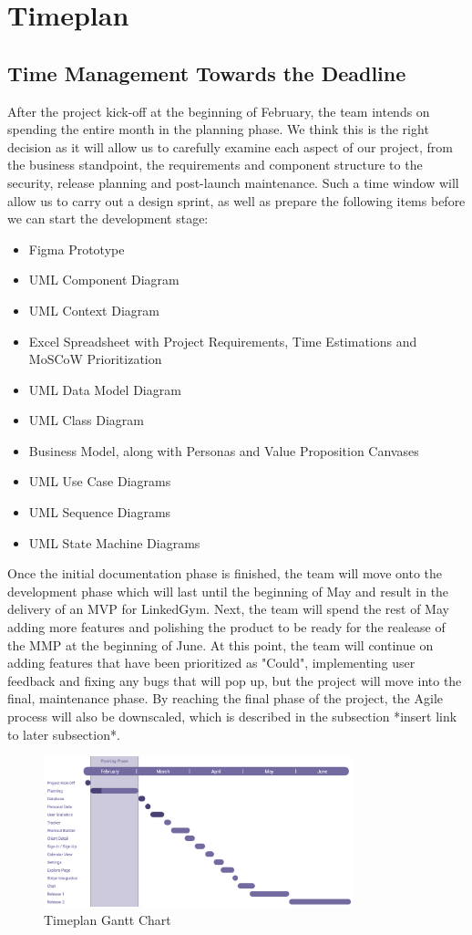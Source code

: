 \section{Timeplan}

\subsection{Time Management Towards the Deadline}

After the project kick-off at the beginning of February, the team intends on spending the entire month in the planning phase. We think
this is the right decision as it will allow us to carefully examine each aspect of our project, from the business standpoint, the requirements
and component structure to the security, release planning and post-launch maintenance. Such a time window will allow us to carry out a design sprint,
as well as prepare the following items before we can start the development stage:
\begin{itemize}
    \item Figma Prototype
    \item UML Component Diagram
    \item UML Context Diagram
    \item Excel Spreadsheet with Project Requirements, Time Estimations and MoSCoW Prioritization
    \item UML Data Model Diagram
    \item UML Class Diagram
    \item Business Model, along with Personas and Value Proposition Canvases
    \item UML Use Case Diagrams
    \item UML Sequence Diagrams
    \item UML State Machine Diagrams
\end{itemize}

Once the initial documentation phase is finished, the team will move onto the development phase which will last until the beginning
of May and result in the delivery of an MVP for LinkedGym. Next, the team will spend the rest of May adding more features and polishing
the product to be ready for the realease of the MMP at the beginning of June. At this point, the team will continue on adding features 
that have been prioritized as "Could", implementing user feedback and fixing any bugs that will pop up, but the project will move into the final, maintenance phase.
By reaching the final phase of the project, the Agile process will also be downscaled, which is described in the subsection *insert link to later subsection*.

\begin{figure}[H]
    \centering
    \includegraphics[width=0.8\textwidth]{images/gantt_chart.png}
    \caption{Timeplan Gantt Chart}
    \label{fig:ganttchart}
\end{figure}